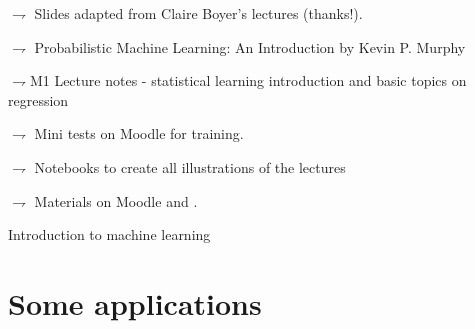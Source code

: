\documentclass[xcolor={usenames,dvipsnames},handout]{beamer}
\begin{document}
\begin{frame}

\vspace{.2cm}

$\rightharpoondown $ Slides adapted from \alert{Claire Boyer}'s lectures \alert{(thanks!)}.

\vspace{.2cm}

$\rightharpoondown $ Probabilistic Machine Learning: An Introduction by Kevin P. Murphy\\
{\tiny \href{https://probml.github.io/pml-book/book1.html\#toc}{}}

\vspace{.2cm}

 $\rightharpoondown $M1 Lecture notes - statistical learning introduction and basic topics on regression\\
{\tiny \href{https://sylvainlc.github.io/}{}}

\vspace{.5cm}


\vspace{.2cm}

$\rightharpoondown$ Mini tests  on Moodle for training.

\vspace{.3cm}

$\rightharpoondown$ Notebooks to create all illustrations of the lectures 
{\tiny \href{https://sylvainlc.github.io/}{}}

\vspace{.2cm}

$\rightharpoondown$ Materials on Moodle and  {\tiny \href{https://sylvainlc.github.io/}{}}.


\end{frame}

\begin{frame}{Introduction to machine learning}
\tableofcontents
\end{frame}



\section{Some applications}
\end{document}

